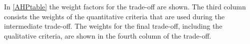 In \autoref{AHPtable} the weight factors for the trade-off are shown. The third column consists the weights of the quantitative criteria that are used during the intermediate trade-off. The weights for the final trade-off, including the qualitative criteria, are shown in the fourth column of the trade-off.




